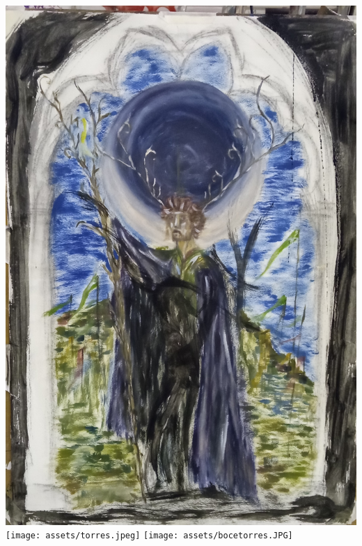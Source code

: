 \documentclass[twoside]{article}
\begin{document}
\begin{center}
    \newpage
    \includegraphics[width=\textwidth,height=\textheight,keepaspectratio]{assets/Final.jpg}
    \newpage
    \texttt{[image: assets/torres.jpeg]}
    \newpage
    \texttt{[image: assets/bocetorres.JPG]}
    \newpage

\end{center}
\end{document}
